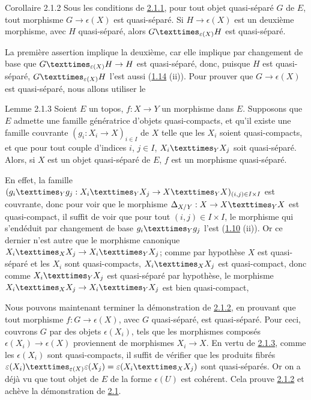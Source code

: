 \documentclass[10pt]{../fichiers-configuration-latex/smfart}
\begin{document}
\begin{enonce*}{Corollaire 2.1.2}
Sous les conditions de \hyperref[VI.cor2.1.1]{2.1.1}, pour tout objet quasi-séparé $G$ de $E$,
tout morphisme $G \to \epsilon(X)$ est quasi-séparé. Si $H \to
\epsilon(X)$ est un deuxième morphisme, avec $H$ quasi-séparé,
alors $\fprod{G}{H}{\epsilon(X)}$ est quasi-séparé.
\end{enonce*}

La première assertion implique la deuxième, car elle implique par
changement de base que $\fprod{G}{H}{\epsilon(X)} \to H$ est quasi-séparé,
donc, puisque $H$ est quasi-séparé, $\fprod{G}{H}{\epsilon(X)}$
l'est aussi (\hyperref[VI.prop1.14]{1.14} (ii)). Pour prouver que $G \to \epsilon(X)$ est quasi-séparé,
nous allons utiliser le

\begin{enonce*}{Lemme 2.1.3}
Soient $E$ un topos, $f : X \to Y$ un morphisme dans $E$. Supposons
que $E$ admette une famille génératrice d'objets quasi-compacts, et
qu'il existe une famille couvrante $(g_i : X_i \to X)_{i \in I}$ de
$X$ telle que les $X_i$ soient quasi-compacts, et que pour tout couple
d'indices $i$, $j \in I$, $\fprod{X_i}{X_j}{Y}$ soit
quasi-séparé. Alors, si $X$ est un objet quasi-séparé de $E$, $f$ est
un morphisme quasi-séparé.
\end{enonce*}

En effet, la famille $(\fprod{g_i}{g_j}{Y} : \fprod{X_i}{X_j}{Y} \to
\fprod{X}{X}{Y})_{(i, j) \in I \times I}$ est couvrante, donc pour
voir que le morphisme $\Delta_{X/Y} : X \to \fprod{X}{X}{Y}$ est
quasi-compact, il suffit de voir que pour tout $(i, j) \in I \times
I$, le morphisme qui s'en\pageoriginale déduit par changement de base
$\fprod{g_i}{g_j}{Y}$ l'est (\hyperref[VI.prop1.10]{1.10} (ii)). Or ce dernier n'est autre que
le morphisme canonique $\fprod{X_i}{X_j}{X} \to \fprod{X_i}{X_j}{Y}$;
comme par hypothèse $X$ est quasi-séparé et les $X_i$ sont
quasi-compacts, $\fprod{X_{i}}{X_{j}}{X}$ est quasi-compact, donc
comme $\fprod{X_{i}}{X_{j}}{Y}$ est quasi-séparé par hypothèse, le
morphisme $\fprod{X_{i}}{X_{j}}{X}\to \fprod{X_{i}}{X_{j}}{Y}$ est
bien quasi-compact,\cqfd

Nous pouvons maintenant terminer la démonstration de \hyperref[VI.cor2.1.2]{2.1.2}, en
prouvant que tout morphisme $f : G \to \epsilon(X)$, avec 
$G$ quasi-séparé, est quasi-séparé. Pour ceci, couvrons $G$ par des
objets $\epsilon(X_i)$, tels que les morphismes composés
$\epsilon(X_i) \to \epsilon(X)$ proviennent de morphismes $X_i
\to X$. En vertu de \hyperref[VI.lem2.1.3]{2.1.3}, comme les $\epsilon(X_i)$ sont
quasi-compacts, il suffit de vérifier que les produits fibrés
$\fprod{\epsilon(X_i)}{\epsilon(X_j)}{\epsilon(X)} =
\epsilon(\fprod{X_i}{X_j}{X})$ sont quasi-séparés. Or on a déjà vu
que tout objet de $E$ de la forme $\epsilon(U)$ est cohérent. Cela
prouve \hyperref[VI.cor2.1.2]{2.1.2} et achève la démonstration de \hyperref[VI.prop2.1]{2.1}.
\end{document}
